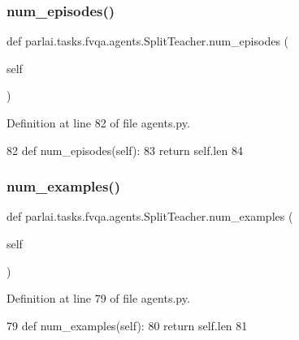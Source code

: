 \subsubsection{\texorpdfstring{num\+\_\+episodes()}{num\_episodes()}}
{\footnotesize\ttfamily def parlai.\+tasks.\+fvqa.\+agents.\+Split\+Teacher.\+num\+\_\+episodes (\begin{DoxyParamCaption}\item[{}]{self }\end{DoxyParamCaption})}



Definition at line 82 of file agents.\+py.


\begin{DoxyCode}
82     \textcolor{keyword}{def }num\_episodes(self):
83         \textcolor{keywordflow}{return} self.len
84 
\end{DoxyCode}
\mbox{\label{classparlai_1_1tasks_1_1fvqa_1_1agents_1_1SplitTeacher_a62ae4928ac59b31290846ac15a59c17a}} 
\subsubsection{\texorpdfstring{num\+\_\+examples()}{num\_examples()}}
{\footnotesize\ttfamily def parlai.\+tasks.\+fvqa.\+agents.\+Split\+Teacher.\+num\+\_\+examples (\begin{DoxyParamCaption}\item[{}]{self }\end{DoxyParamCaption})}



Definition at line 79 of file agents.\+py.


\begin{DoxyCode}
79     \textcolor{keyword}{def }num\_examples(self):
80         \textcolor{keywordflow}{return} self.len
81 
\end{DoxyCode}
\mbox{\label{classparlai_1_1tasks_1_1fvqa_1_1agents_1_1SplitTeacher_accfbbfff00298445b8b33dbe5cbfe40f}} 

